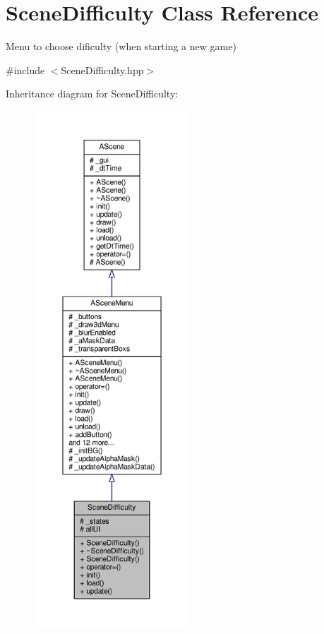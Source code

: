 \hypertarget{class_scene_difficulty}{}\section{Scene\+Difficulty Class Reference}
\label{class_scene_difficulty}


Menu to choose dificulty (when starting a new game)  




{\ttfamily \#include $<$Scene\+Difficulty.\+hpp$>$}



Inheritance diagram for Scene\+Difficulty\+:
\nopagebreak
\begin{figure}[H]
\begin{center}
\leavevmode
\includegraphics[height=550pt]{class_scene_difficulty__inherit__graph}
\end{center}
\end{figure}


